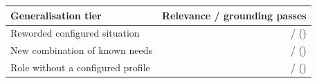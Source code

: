 \begin{tabular}{@{}p{.62\linewidth}r@{}}
\toprule
Generalisation tier & Relevance / grounding passes \\
\midrule
Reworded configured situation & \TierOneRelevance{} / \TierOneGrounding{} (\TierOneCount{}) \\
New combination of known needs & \TierTwoRelevance{} / \TierTwoGrounding{} (\TierTwoCount{}) \\
Role without a configured profile & \TierThreeRelevance{} / \TierThreeGrounding{} (\TierThreeCount{}) \\
\bottomrule
\end{tabular}
